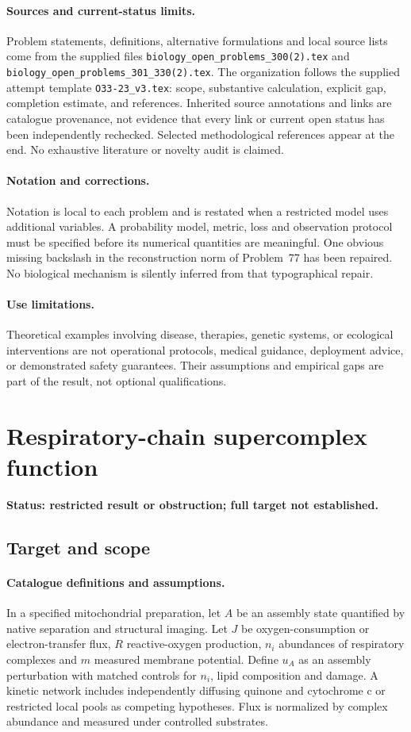 \documentclass[11pt]{article}
\begin{document}
\paragraph{Sources and current-status limits.}
Problem statements, definitions, alternative formulations and local source lists
come from the supplied files
\texttt{biology\_open\_problems\_300(2).tex} and
\texttt{biology\_open\_problems\_301\_330(2).tex}.
The organization follows the supplied attempt template
\texttt{O33-23\_v3.tex}: scope, substantive calculation, explicit gap,
completion estimate, and references. Inherited source annotations and links are
catalogue provenance, not evidence that every link or current open status has
been independently rechecked. Selected methodological references appear at the
end. No exhaustive literature or novelty audit is claimed.

\paragraph{Notation and corrections.}
Notation is local to each problem and is restated when a restricted model uses
additional variables. A probability model, metric, loss and observation protocol
must be specified before its numerical quantities are meaningful. One obvious
missing backslash in the reconstruction norm of Problem~77 has been repaired.
No biological mechanism is silently inferred from that typographical repair.

\paragraph{Use limitations.}
Theoretical examples involving disease, therapies, genetic systems, or ecological
interventions are not operational protocols, medical guidance, deployment advice,
or demonstrated safety guarantees. Their assumptions and empirical gaps are part
of the result, not optional qualifications.


\section*{Respiratory-chain supercomplex function}
\label{prob:012}
\noindent\textbf{Status: restricted result or obstruction; full target not established.}
\subsection{Target and scope}
\paragraph{Catalogue definitions and assumptions.}
In a specified mitochondrial preparation, let $A$ be an assembly state quantified by native separation and structural imaging. Let $J$ be oxygen-consumption or electron-transfer flux, $R$ reactive-oxygen production, $n_i$ abundances of respiratory complexes and $m$ measured membrane potential. Define $u_A$ as an assembly perturbation with matched controls for $n_i$, lipid composition and damage. A kinetic network includes independently diffusing quinone and cytochrome c or restricted local pools as competing hypotheses. Flux is normalized by complex abundance and measured under controlled substrates.
\end{document}
